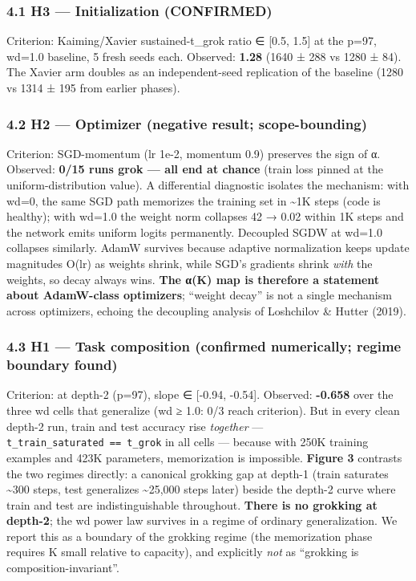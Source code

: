 \documentclass[
  11pt,
]{article}
\begin{document}
\subsubsection{4.1 H3 --- Initialization
(CONFIRMED)}\label{h3-initialization-confirmed}

Criterion: Kaiming/Xavier sustained-t\_grok ratio ∈ {[}0.5, 1.5{]} at
the p=97, wd=1.0 baseline, 5 fresh seeds each. Observed: \textbf{1.28}
(1640 ± 288 vs 1280 ± 84). The Xavier arm doubles as an independent-seed
replication of the baseline (1280 vs 1314 ± 195 from earlier phases).

\subsubsection{4.2 H2 --- Optimizer (negative result;
scope-bounding)}\label{h2-optimizer-negative-result-scope-bounding}

Criterion: SGD-momentum (lr 1e-2, momentum 0.9) preserves the sign of α.
Observed: \textbf{0/15 runs grok --- all end at chance} (train loss
pinned at the uniform-distribution value). A differential diagnostic
isolates the mechanism: with wd=0, the same SGD path memorizes the
training set in \textasciitilde1K steps (code is healthy); with wd=1.0
the weight norm collapses 42 → 0.02 within 1K steps and the network
emits uniform logits permanently. Decoupled SGDW at wd=1.0 collapses
similarly. AdamW survives because adaptive normalization keeps update
magnitudes O(lr) as weights shrink, while SGD's gradients shrink
\emph{with} the weights, so decay always wins. \textbf{The α(K) map is
therefore a statement about AdamW-class optimizers}; ``weight decay'' is
not a single mechanism across optimizers, echoing the decoupling
analysis of Loshchilov \& Hutter (2019).

\subsubsection{4.3 H1 --- Task composition (confirmed numerically;
regime boundary
found)}\label{h1-task-composition-confirmed-numerically-regime-boundary-found}

Criterion: at depth-2 (p=97), slope ∈ {[}-0.94, -0.54{]}. Observed:
\textbf{-0.658} over the three wd cells that generalize (wd ≥ 1.0: 0/3
reach criterion). But in every clean depth-2 run, train and test
accuracy rise \emph{together} ---
\texttt{t\_train\_saturated\ ==\ t\_grok} in all cells --- because with
250K training examples and 423K parameters, memorization is impossible.
\textbf{Figure 3} contrasts the two regimes directly: a canonical
grokking gap at depth-1 (train saturates \textasciitilde300 steps, test
generalizes \textasciitilde25,000 steps later) beside the depth-2 curve
where train and test are indistinguishable throughout. \textbf{There is
no grokking at depth-2}; the wd power law survives in a regime of
ordinary generalization. We report this as a boundary of the grokking
regime (the memorization phase requires K small relative to capacity),
and explicitly \emph{not} as ``grokking is composition-invariant''.
\end{document}
